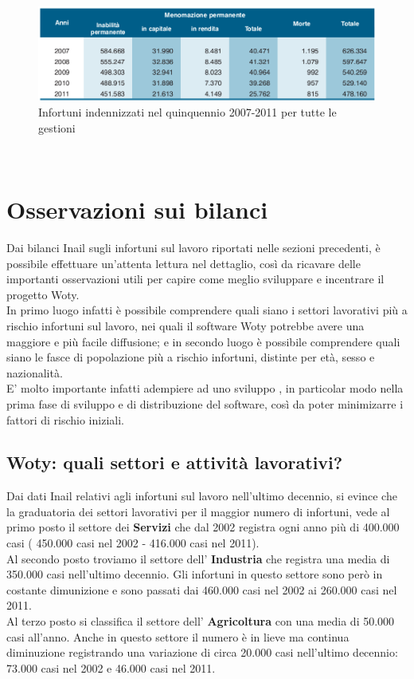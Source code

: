 \begin{figure}[H]
\centering
\includegraphics[scale=0.55]{images/cap4/analisiDiMercato/infortuniIndennizzi2}
\caption{Infortuni indennizzati nel quinquennio 2007-2011 per tutte le gestioni}
\end{figure}




\ \ \
\section{Osservazioni sui bilanci}
Dai bilanci Inail sugli infortuni sul lavoro riportati nelle sezioni precedenti, è possibile effettuare un'attenta lettura nel dettaglio, così da ricavare delle importanti osservazioni utili per capire come meglio sviluppare e incentrare il progetto Woty.\\
In primo luogo infatti è possibile comprendere quali siano i settori lavorativi più a rischio infortuni sul lavoro, nei quali il software Woty potrebbe avere una maggiore e più facile diffusione; e in secondo luogo è possibile comprendere quali siano le fasce di popolazione più a rischio infortuni, distinte per età, sesso e nazionalità.\\
E' molto importante infatti adempiere ad uno sviluppo \virgolette{mirato}, in particolar modo nella prima fase di sviluppo e di distribuzione del software, così da poter minimizarre i fattori di rischio iniziali.\\


\subsection{Woty: quali settori e attività lavorativi?}
Dai dati Inail relativi agli infortuni sul lavoro nell'ultimo decennio, si evince che la graduatoria dei settori lavorativi per il maggior numero di infortuni, vede al primo posto il settore dei \textbf{Servizi} che dal 2002 registra ogni anno più di 400.000 casi ( 450.000 casi nel 2002 - 416.000 casi nel 2011).\\
Al secondo posto troviamo il settore dell' \textbf{Industria} che registra una media di 350.000 casi nell'ultimo decennio. Gli infortuni in questo settore sono però in costante dimunizione e sono passati dai 460.000 casi nel 2002 ai 260.000 casi nel 2011.\\
Al terzo posto si classifica il settore dell' \textbf{Agricoltura} con una media di 50.000 casi all'anno. Anche in questo settore il numero è in lieve ma continua diminuzione registrando una variazione di circa 20.000 casi nell'ultimo decennio: 73.000 casi nel 2002 e 46.000 casi nel 2011.\\

